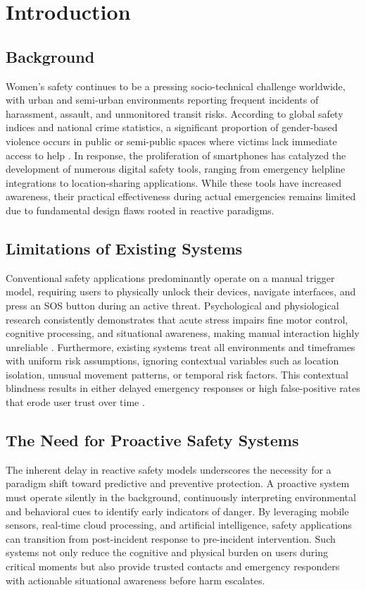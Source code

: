 \section{Introduction}

\subsection{Background}
Women's safety continues to be a pressing socio-technical challenge worldwide, with urban and semi-urban environments reporting frequent incidents of harassment, assault, and unmonitored transit risks. According to global safety indices and national crime statistics, a significant proportion of gender-based violence occurs in public or semi-public spaces where victims lack immediate access to help \cite{who2018}. In response, the proliferation of smartphones has catalyzed the development of numerous digital safety tools, ranging from emergency helpline integrations to location-sharing applications. While these tools have increased awareness, their practical effectiveness during actual emergencies remains limited due to fundamental design flaws rooted in reactive paradigms.

\subsection{Limitations of Existing Systems}
Conventional safety applications predominantly operate on a manual trigger model, requiring users to physically unlock their devices, navigate interfaces, and press an SOS button during an active threat. Psychological and physiological research consistently demonstrates that acute stress impairs fine motor control, cognitive processing, and situational awareness, making manual interaction highly unreliable \cite{nij2022}. Furthermore, existing systems treat all environments and timeframes with uniform risk assumptions, ignoring contextual variables such as location isolation, unusual movement patterns, or temporal risk factors. This contextual blindness results in either delayed emergency responses or high false-positive rates that erode user trust over time \cite{dhillon2021}.

\subsection{The Need for Proactive Safety Systems}
The inherent delay in reactive safety models underscores the necessity for a paradigm shift toward predictive and preventive protection. A proactive system must operate silently in the background, continuously interpreting environmental and behavioral cues to identify early indicators of danger. By leveraging mobile sensors, real-time cloud processing, and artificial intelligence, safety applications can transition from post-incident response to pre-incident intervention. Such systems not only reduce the cognitive and physical burden on users during critical moments but also provide trusted contacts and emergency responders with actionable situational awareness before harm escalates.

